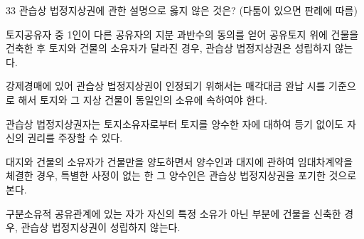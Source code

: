 \begin{question}{33}
관습상 법정지상권에 관한 설명으로 옳지 않은 것은? (다툼이 있으면 판례에 따름)
\begin{choices}
  \item 토지공유자 중 1인이 다른 공유자의 지분 과반수의 동의를 얻어 공유토지 위에 건물을 건축한 후 토지와 건물의 소유자가 달라진 경우, 관습상 법정지상권은 성립하지 않는다.
  \item 강제경매에 있어 관습상 법정지상권이 인정되기 위해서는 매각대금 완납 시를 기준으로 해서 토지와 그 지상 건물이 동일인의 소유에 속하여야 한다.
  \item 관습상 법정지상권자는 토지소유자로부터 토지를 양수한 자에 대하여 등기 없이도 자신의 권리를 주장할 수 있다.
  \item 대지와 건물의 소유자가 건물만을 양도하면서 양수인과 대지에 관하여 임대차계약을 체결한 경우, 특별한 사정이 없는 한 그 양수인은 관습상 법정지상권을 포기한 것으로 본다.
  \item 구분소유적 공유관계에 있는 자가 자신의 특정 소유가 아닌 부분에 건물을 신축한 경우, 관습상 법정지상권이 성립하지 않는다.
\end{choices}
\end{question}
